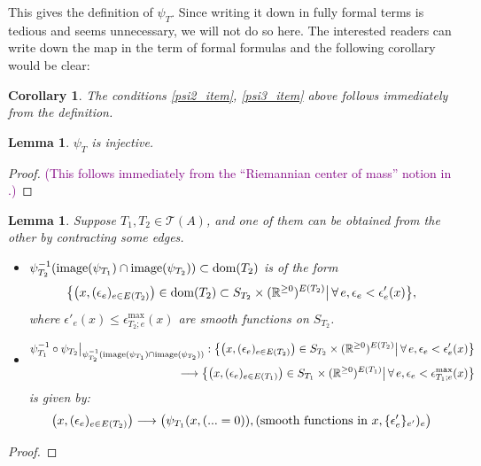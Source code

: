 \documentclass[11pt]{article}
\newtheorem{lmm}[thm]{Lemma}
\newtheorem{crl}[thm]{Corollary}
\theoremstyle{definition}
\theoremstyle{remark}
\def\R{\mathbb{R}}
\def\cT{\mathcal{T}}
\def\dom{{\tn{dom}}}
\def\cmt#1{\textcolor{purple}{(#1)}}
\def\tn#1{\textnormal{#1}}
\begin{document}
This gives the definition of $\psi_T$. Since writing it down in fully formal terms is tedious and seems unnecessary, we will not do so here. 
The interested readers can write down the map in the term of formal formulas and the following corollary would be clear:  

\begin{crl}
The conditions \ref{psi2_item}, \ref{psi3_item} above follows immediately from the definition. 
\end{crl}

\begin{lmm}
$\psi_T$ is injective. 
\end{lmm}
\begin{proof}
\cmt{This follows immediately from the ``Riemannian center of mass'' notion in \cite{GroveKarcher}.}
\end{proof}

\begin{lmm}
Suppose $T_1,T_2\in\cT(A)$, and one of them can be obtained from the other by contracting some edges.  
\begin{itemize}
\item $\psi_{T_2}^{-1}(\tn{image}(\psi_{T_1})\cap\tn{image}(\psi_{T_2}))\subset\dom(T_2)$ is of the form 
$$\big\{\big(x,(\epsilon_e)_{e\in E(T_2)}\big)\in \dom(T_2)\subset S_{T_2}\times(\R^{\ge0})^{E(T_2)}\big|\,\forall\,e, \epsilon_e<\epsilon'_e(x)\big\},$$
where $\epsilon'_e(x)\le \epsilon^{\max}_{T_2;e}(x)$ are smooth functions on $S_{T_2}$. 
\item 
\begin{align*}
\psi_{T_1}^{-1}\circ\psi_{T_2}\big|_{\psi_{T_2}^{-1}(\tn{image}(\psi_{T_1})\cap\tn{image}(\psi_{T_2}))}:
\big\{\big(x,(\epsilon_e)_{e\in E(T_2)}\big)\in S_{T_2}\times(\R^{\ge0})^{E(T_2)}\big|\,\forall\,e, \epsilon_e<\epsilon'_e(x)\big\}\\
\longrightarrow
\big\{\big(x,(\epsilon_e)_{e\in E(T_1)}\big)\in S_{T_1}\times(\R^{\ge0})^{E(T_1)}\big|\,\forall\,e, \epsilon_e<\epsilon^{\max}_{T_1;e}(x)\big\}
\end{align*}
is given by: 
$$
\big(x,(\epsilon_e)_{e\in E(T_2)}\big)\longrightarrow \big( \psi_{T_1}(x,(...=0)), (\tn{smooth functions in }x, \{\epsilon_e'\}_{e'})_e \big)
$$
\end{itemize}
\end{lmm}

\begin{proof}

\end{proof}
\end{document}
